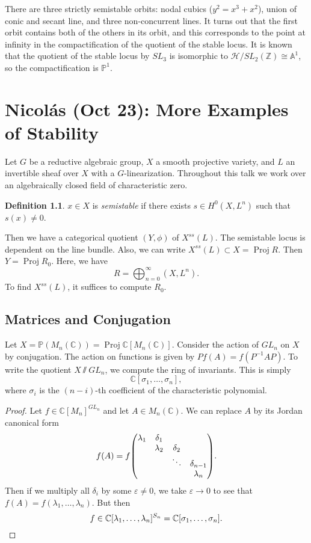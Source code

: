 \documentclass[leqno, openany]{memoir}
\theoremstyle{definition}
\newtheorem{defn}[thm]{Definition}
\theoremstyle{remark}
\theoremstyle{plain}
\theoremstyle{definition}
\theoremstyle{remark}
\newcommand{\A}{\mathbb{A}}
\newcommand{\C}{\mathbb{C}}
\newcommand{\Z}{\mathbb{Z}}
\renewcommand{\P}{\mathbb{P}}
\newcommand{\ep}{\varepsilon}
\newcommand{\mc}[1]{\mathcal{#1}}
\DeclareMathOperator{\Proj}{Proj}
\begin{document}
There are three strictly semistable orbits: nodal cubics ($y^2 = x^3 + x^2$),
union of conic and secant line, and three non-concurrent lines. It turns out
that the first orbit contains both of the others in its orbit, and this
corresponds to the point at infinity in the compactification of the quotient of
the stable locus. It is known that the quotient of the stable locus by $SL_3$
is isomorphic to $\mc{H} / SL_2(\Z) \cong \A^1$, so the compactification is
$\P^1$.

\chapter{Nicol\'as (Oct 23): More Examples of Stability}%
\label{cha:nicolas_oct_23_more_examples_of_stability}

Let $G$ be a reductive algebraic group, $X$ a smooth projective variety, and
$L$ an invertible sheaf over $X$ with a $G$-linearization. Throughout this talk
we work over an algebraically closed field of characteristic zero.

\begin{defn} $x \in X$ is \textit{semistable} if there exists $s \in H^0(X,
L^n)$ such that $s(x) \neq 0$.  \end{defn}

Then we have a categorical quotient $(Y, \phi)$ of $X^{ss}(L)$. The semistable
locus is dependent on the line bundle. Also, we can write $X^{ss}(L) \subset X
= \operatorname{Proj} R$. Then $Y = \operatorname{Proj} R_0$. Here, we have \[
R = \bigoplus_{n=0}^{\infty}(X, L^n). \] To find $X^{ss}(L)$, it suffices to
compute $R_0$.

\section{Matrices and Conjugation}%

Let $X = \P(M_{n}(\C)) = \Proj \C[M_{n}(\C)]$. Consider the action of $GL_n$ on
$X$ by conjugation. The action on functions is given by $Pf(A) = f(P^{-1}AP)$.
To write the quotient $X \sslash GL_n$, we compute the ring of invariants. This
is simply \[ \C[\sigma_1, \ldots, \sigma_n], \] where $\sigma_i$ is the
$(n-i)$-th coefficient of the characteristic polynomial. 

\begin{proof} Let $f \in \C[M_n]^{GL_n}$ and let $A \in M_n(\C)$. We can
    replace $A$ by its Jordan canonical form \[ f(A) = f \mqty(\lambda_1 &
    \delta_1 & & \\ & \lambda_2 & \delta_2 & \\ & & \ddots & \delta_{n-1} \\ &
             & & \lambda_n). \] Then if we multiply all $\delta_i$ by some $\ep
             \neq 0$, we take $\ep \to 0$ to see that $f(A) = f(\lambda_1,
             \ldots, \lambda_n)$. But then \[ f \in \C[\lambda_1, \ldots,
             \lambda_n]^{S_n} = \C[\sigma_1, \ldots, \sigma_n]. \qedhere \]
         \end{proof}
\end{document}
